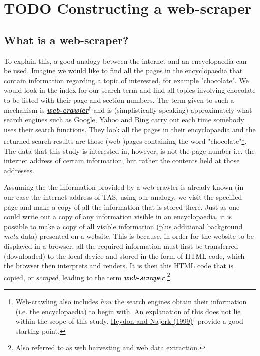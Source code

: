 \documentclass{article}
\begin{document}
\section{{\bfseries\sffamily TODO} Constructing a web-scraper}
\label{sec-3}


\subsection{What is a web-scraper?}
\label{sec-3-1}

To explain this, a good analogy between the internet and an encyclopaedia can be used. Imagine we would like to find all the pages in the encyclopaedia that contain information regarding a topic of interested, for example "chocolate". We would look in the index for our search term and find all topics involving chocolate to be listed with their page and section numbers. The term given to such a mechanism is \textbf{\href{https://en.wikipedia.org/wiki/Web_crawler}{\emph{web-crawler$^{\dag{}}$}}} and is (simplistically speaking) approximately what search engines such as Google, Yahoo and Bing carry out each time somebody uses their search functions. They look all the pages in their encyclopaedia and the returned search results are those (web-)pages containing the word "chocolate"\footnote{Web-crawling also includes \emph{how} the search engines obtain their information (i.e. the encyclopaedia) to begin with. An explanation of this does not lie within the scope of this study. \href{http://link.springer.com/article/10.1023/A:1019213109274}{Heydon and Najork (1999)$^{\dag{}}$} provide a good starting point.}. The data that this study is interested in, however, is not the page number i.e. the internet address of certain information, but rather the contents held at those addresses.

Assuming the the information provided by a web-crawler is already known (in our case the internet address of TAS, using our analogy, we visit the specified page and make a copy of all the information that is stored there. Just as one could write out a copy of any information visible in an encyclopaedia, it is possible to make a copy of all visible information (plus additional background \emph{meta} data) presented on a website. This is because, in order for the website to be displayed in a browser, all the required information must first be transferred (downloaded) to the local device and stored in the form of HTML code, which the browser then interprets and renders. It is then this HTML code that is copied, or \emph{scraped}, leading to the term \textbf{\emph{web-scraper}} \footnote{Also referred to as web harvesting and web data extraction.}.
\end{document}
